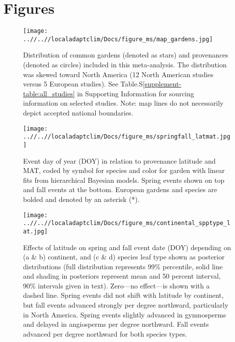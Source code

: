 \documentclass{article}
\begin{document}
\section{Figures}
\begin{figure}[!h] 
    \centering
 \texttt{[image: ..//..//localadaptclim/Docs/figure\_ms/map\_gardens.jpg]}
    \caption{Distribution of common gardens (denoted as stars) and provenances (denoted as circles) included in this meta-analysis. The distribution was skewed toward North America (12 North American studies versus 5 European studies). See Table.S\ref{supplement-table:all_studies} in Supporting Information for sourcing information on selected studies. Note: map lines do not necessarily depict accepted national boundaries.}
    \label{figure:map_gardens}
\end{figure}


\begin{figure}[!h] 
    \centering
 \texttt{[image: ..//..//localadaptclim/Docs/figure\_ms/springfall\_latmat.jpg]}
    \caption{Event day of year (DOY) in relation to provenance latitude and MAT, coded by symbol for species and color for garden with linear fits from hierarchical Bayesian models. Spring events shown on top and fall events at the bottom. European gardens and species are bolded and denoted by an asterisk (*). } 
    \label{figure:springfall_latmat}
\end{figure}

\begin{figure}[!h] 
    \centering
 \texttt{[image: ..//..//localadaptclim/Docs/figure\_ms/continental\_spptype\_lat.jpg]}
    \caption{Effects of latitude on spring and fall event date (DOY) depending on (a \& b) continent, and (c \& d) species leaf type shown as posterior distributions (full distribution represents 99\% percentile, solid line and shading in posteriors represent mean and 50 percent interval, 90\% intervals given in text). Zero---no effect---is shown with a dashed line. Spring events did not shift with latitude by continent, but fall events advanced strongly per degree northward, particularly in North America. Spring events slightly advanced in gymnosperms and delayed in angiosperms per degree northward. Fall events advanced per degree northward for both species types.}
    \label{figure:continental_spptype_lat}
\end{figure}
\end{document}
